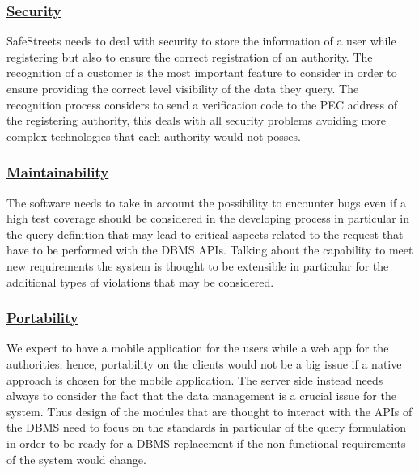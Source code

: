 		\subsubsection[Security]{\hyperlink{toc}{Security}}
			SafeStreets needs to deal with security to store the information of a user while registering but also to ensure the correct registration of an authority. The recognition of a customer is the most important feature to consider in order to ensure providing the correct level visibility of the data they query. The recognition process considers to send a verification code to the PEC address of the registering authority, this deals with all security problems avoiding more complex technologies that each authority would not posses.
		\subsubsection[Maintainability]{\hyperlink{toc}{Maintainability}}
			The software needs to take in account the possibility to encounter bugs even if a high test coverage should be considered in the developing process in particular in the query definition that may lead to critical aspects related to the request that have to be performed with the DBMS APIs. Talking about the capability to meet new requirements the system is thought to be extensible in particular for the additional types of violations that may be considered. 
		\subsubsection[Portability]{\hyperlink{toc}{Portability}}
			We expect to have a mobile application for the users while a web app for the authorities; hence, portability on the clients would not be a big issue if a native approach is chosen for the mobile application. The server side instead needs always to consider the fact that the data management is a crucial issue for the system. Thus design of the modules that are thought to interact with the APIs of the DBMS need to focus on the standards in particular of the query formulation in order to be ready for a DBMS replacement if the non-functional requirements of the system would change.
